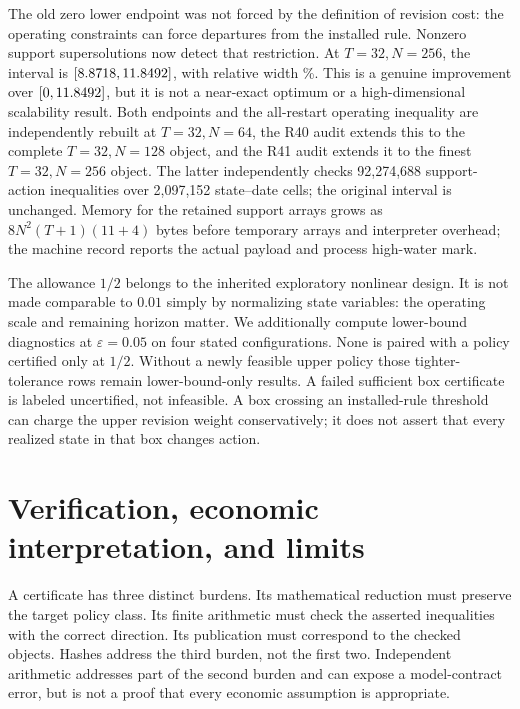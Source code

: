 The old zero lower endpoint was not forced by the definition of revision cost: the operating constraints can force departures from the installed rule. Nonzero support supersolutions now detect that restriction. At $T=32,N=256$, the interval is $[8.8718,11.8492]$, with relative width \NonlinearFineRelative\%. This is a genuine improvement over $[0,11.8492]$, but it is not a near-exact optimum or a high-dimensional scalability result. Both endpoints and the all-restart operating inequality are independently rebuilt at $T=32,N=64$, the R40 audit extends this to the complete $T=32,N=128$ object, and the R41 audit extends it to the finest $T=32,N=256$ object. The latter independently checks 92,274,688 support-action inequalities over 2,097,152 state--date cells; the original interval is unchanged. Memory for the retained support arrays grows as $8N^2(T+1)(11+4)$ bytes before temporary arrays and interpreter overhead; the machine record reports the actual payload and process high-water mark.

The allowance $1/2$ belongs to the inherited exploratory nonlinear design. It is not made comparable to $0.01$ simply by normalizing state variables: the operating scale and remaining horizon matter. We additionally compute lower-bound diagnostics at $\varepsilon=0.05$ on four stated configurations. None is paired with a policy certified only at $1/2$. Without a newly feasible upper policy those tighter-tolerance rows remain lower-bound-only results. A failed sufficient box certificate is labeled uncertified, not infeasible. A box crossing an installed-rule threshold can charge the upper revision weight conservatively; it does not assert that every realized state in that box changes action.

\section{Verification, economic interpretation, and limits}\label{sec:verification}
A certificate has three distinct burdens. Its mathematical reduction must preserve the target policy class. Its finite arithmetic must check the asserted inequalities with the correct direction. Its publication must correspond to the checked objects. Hashes address the third burden, not the first two. Independent arithmetic addresses part of the second burden and can expose a model-contract error, but is not a proof that every economic assumption is appropriate.

